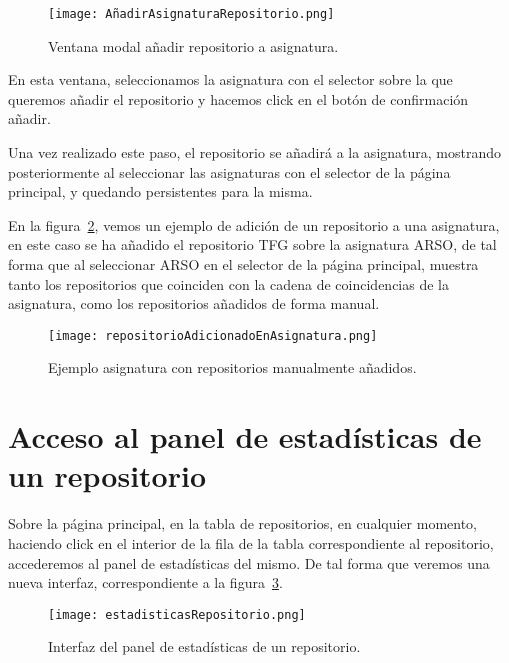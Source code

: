     \begin{figure}[h!]
      \texttt{[image: AñadirAsignaturaRepositorio.png]}
      \caption{Ventana modal añadir repositorio a asignatura.}
      \label{figure:repoAAsignatura}
    \end{figure}

    En esta ventana, seleccionamos la asignatura con el selector sobre la que queremos añadir el repositorio y hacemos click en el botón de confirmación añadir. 

    Una vez realizado este paso, el repositorio se añadirá a la asignatura, mostrando posteriormente al seleccionar las asignaturas con el selector de la página principal, y quedando persistentes para la misma.

    En la figura~\ref{figure:asignaturaConReposManuales}, vemos un ejemplo de adición de un repositorio a una asignatura, en este caso se ha añadido el repositorio TFG sobre la asignatura ARSO, de tal forma que al seleccionar ARSO en el selector de la página principal, muestra tanto los repositorios que coinciden con la cadena de coincidencias de la asignatura, como los repositorios añadidos de forma manual.

    \begin{figure}[h!]
      \texttt{[image: repositorioAdicionadoEnAsignatura.png]}
      \caption{Ejemplo asignatura con repositorios manualmente añadidos.}
      \label{figure:asignaturaConReposManuales}
    \end{figure}

\section{Acceso al panel de estadísticas de un repositorio}

    Sobre la página principal, en la tabla de repositorios, en cualquier momento, haciendo click en el interior de la fila de la tabla correspondiente al repositorio, accederemos al panel de estadísticas del mismo. De tal forma que veremos una nueva interfaz, correspondiente a la figura~\ref{figure:estadRepo}.

    \begin{figure}[h!]
      \texttt{[image: estadisticasRepositorio.png]}
      \caption{Interfaz del panel de estadísticas de un repositorio.}
      \label{figure:estadRepo}
    \end{figure}

